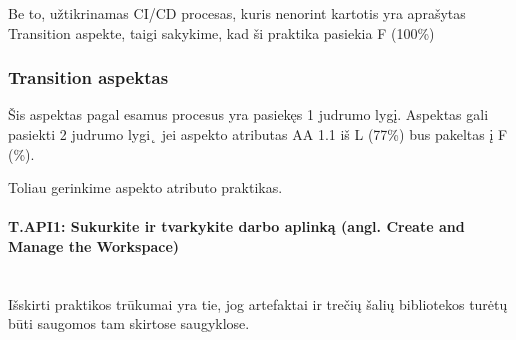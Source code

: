 \documentclass{article}
\newcommand{\subsubsubsection}[1]{\paragraph{#1}\mbox{}\\}
\begin{document}
Be to, užtikrinamas CI/CD procesas, kuris nenorint kartotis yra aprašytas Transition aspekte, taigi sakykime, kad ši praktika pasiekia F (100\%)

\newpage
\subsubsection{Transition aspektas}

Šis aspektas pagal esamus procesus yra pasiekęs 1 judrumo lygį. Aspektas gali pasiekti 2 judrumo lygi˛ jei aspekto 
atributas AA 1.1 iš L (77\%) bus pakeltas į F (\%).

Toliau gerinkime aspekto atributo praktikas.

\subsubsubsection{T.API1: Sukurkite ir tvarkykite darbo aplinką (angl. Create and Manage the Workspace)}

Išskirti praktikos trūkumai yra tie, jog artefaktai ir trečių šalių bibliotekos turėtų būti saugomos tam skirtose saugyklose. %
\end{document}
